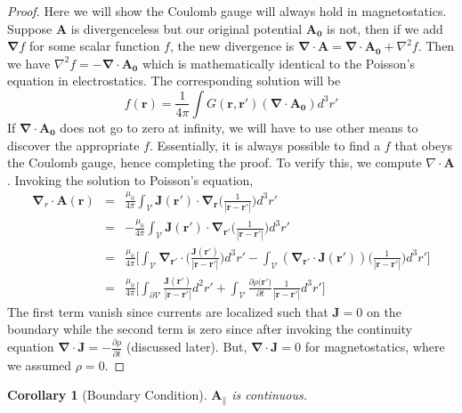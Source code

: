 \documentclass[a4paper]{article}
\theoremstyle{new}
\newtheorem{cor}{Corollary}[section]
\begin{document}
\begin{proof}
Here we will show the Coulomb gauge will always hold in magnetostatics. Suppose $\mathbf{A}$ is divergenceless but our original potential $\mathbf{A_0}$ is not, then if we add $\boldsymbol{\nabla}f$ for some scalar function $f$, the new divergence is $\boldsymbol{\nabla}\cdot\mathbf{A}=\boldsymbol{\nabla}\cdot\mathbf{A_0}+\nabla^2f$. Then we have $\nabla^2f=-\boldsymbol{\nabla}\cdot\mathbf{A_0}$ which is mathematically identical to the Poisson's equation in electrostatics. The corresponding solution will be
$$f(\mathbf{r})=\frac{1}{4\pi}\int G(\mathbf{r},\mathbf{r'})(\boldsymbol{\nabla}\cdot\mathbf{A_0})d^3r'$$
If $\boldsymbol{\nabla}\cdot\mathbf{A_0}$ does not go to zero at infinity, we will have to use other means to discover the appropriate $f$. Essentially, it is always possible to find a $f$ that obeys the Coulomb gauge, hence completing the proof. To verify this, we compute $\nabla\cdot\mathbf{A}$. Invoking the solution to Poisson's equation,
\begin{eqnarray}
\boldsymbol{\nabla}_r\cdot\mathbf{A}(\mathbf{r})&=&\frac{\mu_0}{4\pi}\int_{\mathcal{V}}\mathbf{J}(\mathbf{r'})\cdot\boldsymbol{\nabla}_{\mathbf{r}}\bigg(\frac{1}{|\mathbf{r}-\mathbf{r'}|}\bigg)d^3r'\nonumber\\&=&-\frac{\mu_0}{4\pi}\int_{\mathcal{V}}\mathbf{J}(\mathbf{r'})\cdot\boldsymbol{\nabla}_{\mathbf{r'}}\bigg(\frac{1}{|\mathbf{r}-\mathbf{r'}|}\bigg)d^3r'\nonumber\\&=&\frac{\mu_0}{4\pi}\bigg[\int_{\mathcal{V}}\boldsymbol{\nabla}_{\mathbf{r'}}\cdot\bigg(\frac{\mathbf{J}(\mathbf{r'})}{|\mathbf{r}-\mathbf{r'}|}\bigg)d^3r'-\int_{\mathcal{V}}(\boldsymbol{\nabla}_{\mathbf{r'}}\cdot\mathbf{J}(\mathbf{r'}))\bigg(\frac{1}{|\mathbf{r}-\mathbf{r'}|}\bigg)d^3r'\bigg]\nonumber\\&=&\frac{\mu_0}{4\pi}\bigg[\int_{\partial\mathcal{V}}\frac{\mathbf{J}(\mathbf{r'})}{|\mathbf{r}-\mathbf{r'}|}d^2r'+\int_{\mathcal{V}}\frac{\partial\rho(\mathbf{r')}}{\partial t}\frac{1}{|\mathbf{r}-\mathbf{r'}|}d^3r'\bigg]\nonumber
\end{eqnarray}
The first term vanish since currents are localized such that $\mathbf{J}=0$ on the boundary while the second term is zero since after invoking the continuity equation $\boldsymbol{\nabla}\cdot\mathbf{J}=-\frac{\partial\rho}{\partial t}$ (discussed later). But,  $\boldsymbol{\nabla}\cdot\mathbf{J}=0$ for magnetostatics, where we assumed $\rho=0$.
\end{proof}
\begin{cor}[Boundary Condition]
$\mathbf{A_\parallel}$ is continuous.
\end{cor}
\end{document}

